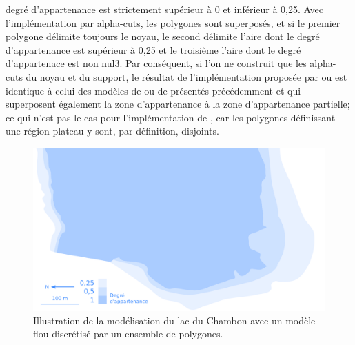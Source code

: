 degré d’appartenance est strictement supérieur à 0 et inférieur à
0,25. Avec l’implémentation par alpha-cuts, les polygones sont
superposés, et si le premier polygone délimite toujours le noyau, le
second délimite l’aire dont le degré d’appartenance est supérieur à
0,25 et le troisième l’aire dont le degré d’appartenace est non
nul3. Par conséquent, si l’on ne construit que les alpha-cuts du noyau
et du support, le résultat de l’implémentation proposée par
\textcite{Zoghalmi2013,Zoghalmi2016} ou \textcite{de Runz2008} est
identique à celui des modèles de \textcite{Cohn1996} ou de
\textcite{Clementini1996} présentés précédemment et qui superposent
également la zone d’appartenance à la zone d’appartenance partielle;
ce qui n’est pas le cas pour l’implémentation de
\textcite{Kanjinal2010}, car les polygones définissant une région
plateau y sont, par définition, disjoints.

\begin{figure}
  \centering
  \includegraphics{../figures/fig9.png}
  \caption{Illustration de la modélisation du lac du Chambon avec un
    modèle flou discrétisé par un ensemble de polygones.}
  \label{fig:champ_polygones}
\end{figure}

